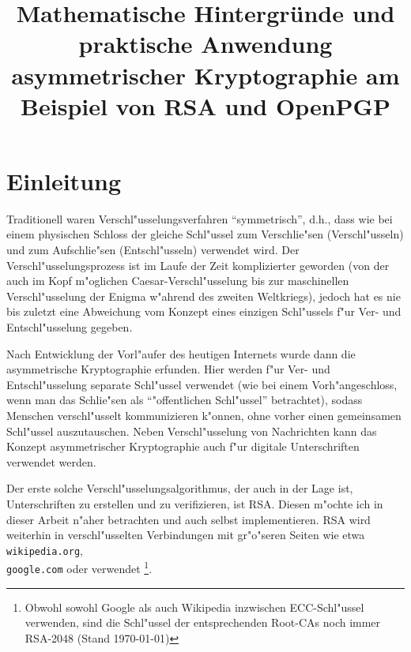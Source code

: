 \documentclass[12pt]{article}
\title{Mathematische Hintergr\"unde und praktische Anwendung asymmetrischer Kryptographie am Beispiel von RSA und OpenPGP}
\begin{document}
\maketitle
\thispagestyle{empty}
\newpage
\tableofcontents
\thispagestyle{empty}
\newpage

\section{Einleitung}

Traditionell waren Verschl"usselungsverfahren "`symmetrisch"', d.h., dass wie bei einem physischen Schloss
der gleiche Schl"ussel zum Verschlie"sen (Verschl"usseln) und zum Aufschlie"sen (Entschl"usseln) verwendet wird.
Der Ver\-schl"us\-sel\-ungs\-pro\-zess ist im Laufe der Zeit komplizierter geworden
(von der auch im Kopf m"oglichen Caesar-Verschl"usselung bis zur
maschinellen Verschl"usselung der Enigma w"ah\-rend des zweiten Weltkriegs),
jedoch hat es nie bis zuletzt
eine Abweichung vom Konzept eines einzigen Schl"ussels f"ur Ver- und Entschl"usselung gegeben.

Nach Entwicklung der Vorl"aufer des heutigen Internets wurde dann die asymmetrische Kryptographie erfunden.
Hier werden f"ur Ver- und Entschl"usselung separate Schl"ussel verwendet
(wie bei einem Vorh"angeschloss, wenn man das Schlie"sen als "`"offentlichen Schl"ussel"' betrachtet),
sodass Menschen verschl"usselt kom\-mu\-ni\-zie\-ren k"onnen, ohne vorher einen gemeinsamen Schl"ussel auszutauschen.
Neben Verschl"usselung von Nachrichten kann das Konzept asymmetrischer Kryptographie
auch f"ur digitale Unterschriften verwendet werden.

Der erste solche Verschl"usselungsalgorithmus, der auch in der Lage ist, Unterschriften zu erstellen und zu verifizieren, ist RSA.
Diesen m"ochte ich in dieser Arbeit n"aher betrachten und auch selbst implementieren.
RSA wird weiterhin in verschl"usselten Verbindungen mit gr"o"seren Seiten
wie etwa \texttt{wikipedia.org}, \\ \texttt{google.com} oder \piibigsite{} verwendet%
\footnote{Obwohl sowohl Google als auch Wikipedia inzwischen ECC-Schl"ussel verwenden,
sind die Schl"ussel der entsprechenden Root-CAs noch immer RSA-2048 (Stand \today)}.
\end{document}
